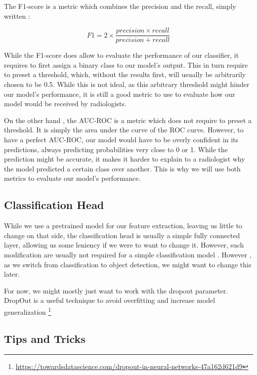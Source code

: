 \documentclass[11pt]{article}
\begin{document}
        The F1-score is a metric which combines the precision and the recall, simply written :

        \begin{equation}
            F1 = 2 \times \frac{precision \times recall}{precision + recall}
        \end{equation}

        While the F1-score does allow to evaluate the performance of our classifier, it requires to first assign a
        binary class to our model's output. This in turn require to preset a threshold, which, without the results first, will usually be arbitrarily
        chosen to be 0.5. While this is not ideal, as this arbitrary threshold might hinder our model's performance,
        it is still a good metric to use to evaluate how our model would be received by radiologists.

        On the other hand , the AUC-ROC is a metric which does not require to preset a threshold. It is simply the area under the curve of the ROC curve.
        However, to have a perfect AUC-ROC, our model would have to be overly confident in its predictions, always
        predicting probabilities very close to 0 or 1. While the prediction might be accurate, it makes it harder to
        explain to a radiologist why the model predicted a certain class over another. This is why we will use both
        metrics to evaluate our model's performance.


    \subsection{Classification Head}

        While we use a pretrained model for our feature extraction, leaving us little to change on that side, the classification head is usually a simple fully connected
        layer, allowing us some leniency if we were to want to change it. However, such modification are usually not required for a simple classification model . However , as we switch
        from  classification to object detection, we might want to change this later.

        For now, we might mostly just want to work with the dropout parameter. DropOut is a useful technique to avoid overfitting and increase model
        generalization \footnote{\url{https://towardsdatascience.com/dropout-in-neural-networks-47a162d621d9}}

    \subsection{Tips and Tricks}
\end{document}
